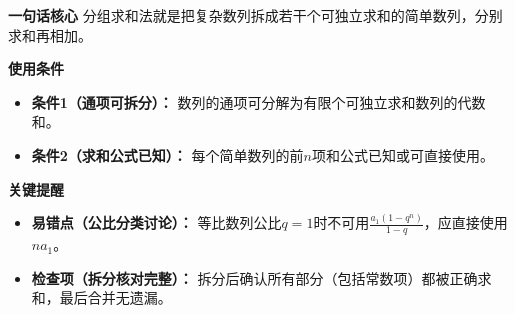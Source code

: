 \begin{summarybox}
	\textbf{\textcolor{CSummary}{一句话核心}}
	分组求和法就是把复杂数列拆成若干个可独立求和的简单数列，分别求和再相加。

	\medskip
	\textbf{\textcolor{CSummary}{使用条件}}
	\begin{itemize}[leftmargin=*, itemsep=0.5em, topsep=0.4em]
		\item \textbf{条件1（通项可拆分）：} 数列的通项可分解为有限个可独立求和数列的代数和。
		\item \textbf{条件2（求和公式已知）：} 每个简单数列的前$n$项和公式已知或可直接使用。
	\end{itemize}

	\medskip
	\textbf{\textcolor{CSummary}{关键提醒}}
	\begin{itemize}[leftmargin=*, itemsep=0.5em, topsep=0.4em]
		\item \textbf{易错点（公比分类讨论）：} 等比数列公比$q=1$时不可用$\frac{a_1(1-q^n)}{1-q}$，应直接使用$n a_1$。
		\item \textbf{检查项（拆分核对完整）：} 拆分后确认所有部分（包括常数项）都被正确求和，最后合并无遗漏。
	\end{itemize}

\end{summarybox}
